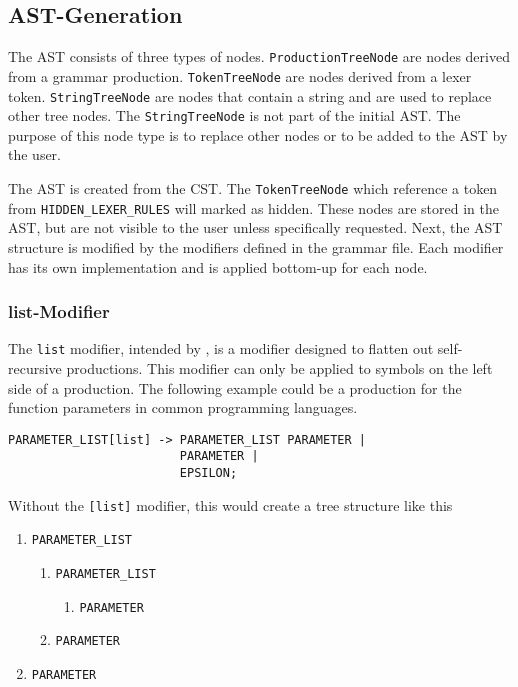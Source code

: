 \subsection{AST-Generation}

The AST consists of three types of nodes. \verb|ProductionTreeNode| are nodes derived from a grammar production. 
\verb|TokenTreeNode| are nodes derived from a lexer token. 
\verb|StringTreeNode| are nodes that contain a string and are used to replace other tree nodes. 
The \verb|StringTreeNode| is not part of the initial AST. The purpose of this node type is to replace other nodes or to be added to the AST by the user.

The AST is created from the CST. 
The \verb|TokenTreeNode| which reference a token from \verb|HIDDEN_LEXER_RULES| will marked as hidden. 
These nodes are stored in the AST, but are not visible to the user unless specifically requested. 
Next, the AST structure is modified by the modifiers defined in the grammar file. 
Each modifier has its own implementation and is applied bottom-up for each node.

\subsubsection{list-Modifier}

The \verb|list| modifier, intended by \cite{GeneratingRewritableAST}, is a modifier designed to flatten out self-recursive productions. This modifier can only be applied to symbols on the left side of a production. The following example could be a production for the function parameters in common programming languages.

\begin{lstlisting}[caption=list modifier example]
PARAMETER_LIST[list] -> PARAMETER_LIST PARAMETER | 
                        PARAMETER | 
                        EPSILON;
\end{lstlisting}

Without the \verb|[list]| modifier, this would create a tree structure like this

\begin{enumerate}
\item	\verb|PARAMETER_LIST|
\begin{enumerate}
\item	\verb|PARAMETER_LIST|
\begin{enumerate}
\item \verb|PARAMETER|
\end{enumerate}
\item \verb|PARAMETER|
\end{enumerate}
\item \verb|PARAMETER|
\end{enumerate}

